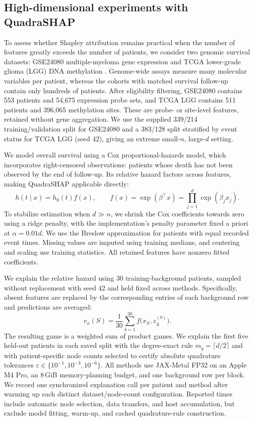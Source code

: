 \subsection{High-dimensional experiments with QuadraSHAP}
\label{sec:high-dimensional-quadrashap}

To assess whether Shapley attribution remains practical when the number of
features greatly exceeds the number of patients, we consider two genomic
survival datasets: GSE24080 multiple-myeloma gene expression
\cite{geo_gse24080} and TCGA lower-grade glioma (LGG) DNA methylation
\cite{tcga_lgg_methylation}.
Genome-wide assays measure many molecular variables per patient, whereas
the cohorts with matched survival follow-up contain only hundreds of patients.
After eligibility filtering, GSE24080 contains 553 patients and 54,675
expression probe sets, and TCGA LGG contains 511 patients and 396,065
methylation sites. These are probe- or site-level features, retained without
gene aggregation. We use the supplied 339/214 training/validation split
for GSE24080 and a 383/128 split stratified by event status for TCGA LGG
(seed 42), giving an extreme small-$n$, large-$d$ setting.

We model overall survival using a Cox proportional-hazards model, which
incorporates right-censored observations: patients whose death has not been
observed by the end of follow-up. Its relative hazard factors across features,
making QuadraSHAP applicable directly:
\[
h(t\mid x)=h_0(t)f(x),
\qquad
f(x)=\exp(\beta^\top x)=\prod_{j=1}^{d}\exp(\beta_jx_j).
\]
To stabilize estimation when $d\gg n$, we shrink the Cox coefficients
towards zero using a ridge penalty, with the implementation's penalty
parameter fixed a priori at $\alpha=0.01d$. We use the Breslow approximation
for patients with equal recorded event times. Missing values are imputed using
training medians, and centering and scaling use training statistics.
All retained features have nonzero fitted coefficients.

We explain the relative hazard using 30 training-background patients,
sampled without replacement with seed 42 and held fixed across methods.
Specifically, absent features are replaced by the corresponding entries
of each background row and predictions are averaged:
\[
v_x(S)=\frac{1}{30}\sum_{b=1}^{30}
f\bigl(x_S,z^{(b)}_{\overline S}\bigr).
\]
The resulting game is a weighted sum of product games. We explain the
first five held-out patients in each saved split with the degree-exact rule
$m_q=\lceil d/2\rceil$ and with patient-specific node counts selected
to certify absolute quadrature tolerances
$\varepsilon\in\{10^{-1},10^{-3},10^{-6}\}$.
All methods use JAX-Metal FP32 on an Apple M4 Pro, an 8\,GiB memory-planning
budget, and one background row per block. We record one synchronized
explanation call per patient and method after warming up each distinct
dataset/node-count configuration. Reported times include automatic node
selection, data transfers, and host accumulation, but exclude model fitting,
warm-up, and cached quadrature-rule construction.

